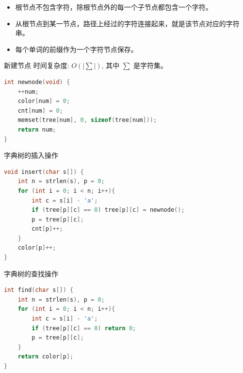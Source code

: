 \begin{frame}
\begin{itemize}
    \item 根节点不包含字符，除根节点外的每一个子节点都包含一个字符。
    \item 从根节点到某一节点，路径上经过的字符连接起来，就是该节点对应的字符串。
    \item 每个单词的前缀作为一个字符节点保存。
\end{itemize}
\end{frame}

\begin{frame}[fragile]{新建节点}
时间复杂度: $O(|\sum|)$, 其中 $\sum$ 是字符集。

\begin{lstlisting}[language=C++]
int newnode(void) {
    ++num;
    color[num] = 0;
    cnt[num] = 0;
    memset(tree[num], 0, sizeof(tree[num]));
    return num;
}
\end{lstlisting}
\end{frame}

\begin{frame}[fragile]{字典树的插入操作}
\begin{lstlisting}[language=C++]
void insert(char s[]) {
    int n = strlen(s), p = 0;
    for (int i = 0; i < n; i++){
        int c = s[i] - 'a';
        if (tree[p][c] == 0) tree[p][c] = newnode();
        p = tree[p][c];
        cnt[p]++;
    }
    color[p]++;
}
\end{lstlisting}
\end{frame}

\begin{frame}[fragile]{字典树的查找操作}
\begin{lstlisting}[language=C++]
int find(char s[]) {
    int n = strlen(s), p = 0;
    for (int i = 0; i < n; i++){
        int c = s[i] - 'a';
        if (tree[p][c] == 0) return 0;
        p = tree[p][c];
    }
    return color[p];
}
\end{lstlisting}
\end{frame}

